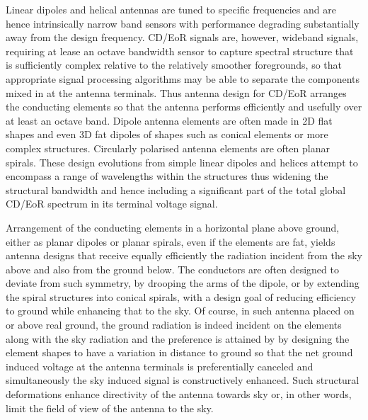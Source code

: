   Linear dipoles and helical antennas are tuned to specific frequencies and are hence intrinsically narrow band sensors with performance degrading substantially away from the design frequency. CD/EoR signals are, however, wideband signals, requiring at lease an octave bandwidth sensor to capture spectral structure that is sufficiently complex relative to the relatively smoother foregrounds, so that appropriate signal processing algorithms may be able to separate the components mixed in at the antenna terminals.  Thus antenna design for CD/EoR arranges the conducting elements so that the antenna performs efficiently and usefully over at least an octave band.  Dipole antenna elements are often made in 2D flat shapes and even 3D fat dipoles of shapes such as conical elements or more complex structures. Circularly polarised antenna elements are often planar spirals.  These design evolutions from simple linear dipoles and helices attempt to encompass a range of wavelengths within the structures thus widening the structural bandwidth and hence including a significant part of the total global CD/EoR spectrum in its terminal voltage signal.
  
  Arrangement of the conducting elements in a horizontal plane above ground, either as planar dipoles or planar spirals, even if the elements are fat, yields antenna designs that receive equally efficiently the radiation incident from the sky above and also from the ground below. The conductors are often designed to deviate from such symmetry, by drooping the arms of the dipole, or by extending the spiral structures into conical spirals, with a design goal of reducing efficiency to ground while enhancing that to the sky. Of course, in such antenna placed on or above real ground, the ground radiation is indeed incident on the elements along with the sky radiation and the preference is attained by by designing the element shapes to have a variation in distance to ground so that the net ground induced voltage at the antenna terminals is preferentially canceled and simultaneously the sky induced signal is constructively enhanced. Such structural deformations enhance directivity of the antenna towards sky or, in other words, limit the field of view of the antenna to the sky.
  
